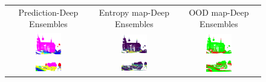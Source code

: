         \begin{figure}[h!]
            \centering
            \begin{tabular}{ccc}
                Prediction-Deep Ensembles & Entropy map-Deep Ensembles & OOD map-Deep Ensembles \\
                \includegraphics[width=0.33\textwidth, height=0.18\textheight]{images/ood_imgs/de_sem3d/de_class_prob_1.png} &
                \includegraphics[width=0.33\textwidth, height=0.18\textheight]{images/ood_imgs/de_sem3d/de_ent_10_1.png}& 
                \includegraphics[width=0.33\textwidth, height=0.18\textheight]{images/ood_imgs/de_sem3d/de_ent_ood_auroc_1.png}\\
    
                \includegraphics[width=0.33\textwidth, height=0.18\textheight]{images/ood_imgs/de_sem3d/de_class_prob_2.png} &
                \includegraphics[width=0.33\textwidth, height=0.18\textheight]{images/ood_imgs/de_sem3d/de_ent_10_2.png}& 
                \includegraphics[width=0.33\textwidth, height=0.18\textheight]{images/ood_imgs/de_sem3d/de_ent_ood_auroc_2.png}\\
    

\end{tabular}
\end{figure}
